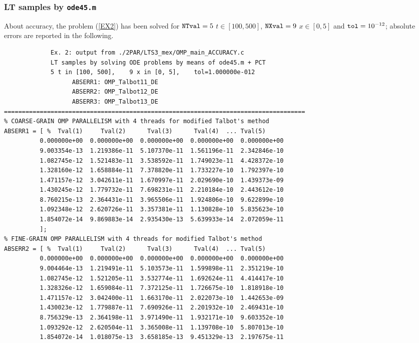 \documentclass[a4paper,10pt]{report}%
\begin{document}
\subsubsection{LT samples by {\tt ode45.m}}
About accuracy, the problem (\ref{EX2}) has been solved for ${\tt NTval}=5$ $t\in[100, 500]$, ${\tt NXval}=9$
$x\in[0,5]$ and ${\tt tol}=10^{-12}$; absolute errors are reported in the following.
\begin{lstlisting}
             Ex. 2: output from ./2PAR/LTS3_mex/OMP_main_ACCURACY.c
             LT samples by solving ODE problems by means of ode45.m + PCT
             5 t in [100, 500],    9 x in [0, 5],    tol=1.000000e-012
                   ABSERR1: OMP_Talbot11_DE
                   ABSERR2: OMP_Talbot12_DE
                   ABSERR3: OMP_Talbot13_DE
====================================================================================
% COARSE-GRAIN OMP PARALLELISM with 4 threads for modified Talbot's method
ABSERR1 = [ %  Tval(1)     Tval(2)      Tval(3)      Tval(4)  ... Tval(5)
          0.000000e+00  0.000000e+00  0.000000e+00  0.000000e+00  0.000000e+00
          9.003354e-13  1.219386e-11  5.107370e-11  1.561196e-11  2.342846e-10
          1.082745e-12  1.521483e-11  3.538592e-11  1.749023e-11  4.428372e-10
          1.328160e-12  1.658884e-11  7.378820e-11  1.733227e-10  1.792397e-10
          1.471157e-12  3.042611e-11  1.670997e-11  2.029690e-10  1.439373e-09
          1.430245e-12  1.779732e-11  7.698231e-11  2.210184e-10  2.443612e-10
          8.760215e-13  2.364431e-11  3.965506e-11  1.924806e-10  9.622899e-10
          1.092348e-12  2.620726e-11  3.357381e-11  1.130828e-10  5.835623e-10
          1.854072e-14  9.869883e-14  2.935430e-13  5.639933e-14  2.072059e-11
          ];
% FINE-GRAIN OMP PARALLELISM with 4 threads for modified Talbot's method
ABSERR2 = [ %  Tval(1)     Tval(2)      Tval(3)      Tval(4)  ... Tval(5)
          0.000000e+00  0.000000e+00  0.000000e+00  0.000000e+00  0.000000e+00
          9.004464e-13  1.219491e-11  5.103573e-11  1.599898e-11  2.351219e-10
          1.082745e-12  1.521205e-11  3.532774e-11  1.692624e-11  4.414417e-10
          1.328326e-12  1.659084e-11  7.372125e-11  1.726675e-10  1.818918e-10
          1.471157e-12  3.042400e-11  1.663170e-11  2.022073e-10  1.442653e-09
          1.430023e-12  1.779887e-11  7.690926e-11  2.201932e-10  2.469431e-10
          8.756329e-13  2.364198e-11  3.971490e-11  1.932171e-10  9.603352e-10
          1.093292e-12  2.620504e-11  3.365008e-11  1.139708e-10  5.807013e-10
          1.854072e-14  1.018075e-13  3.658185e-13  9.451329e-13  2.197675e-11

\end{lstlisting}
\end{document}
